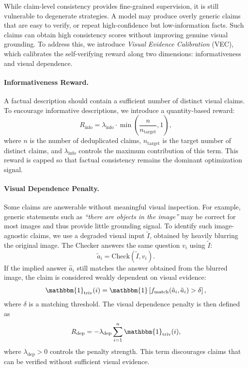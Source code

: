 While claim-level consistency provides fine-grained supervision, it is still
vulnerable to degenerate strategies. A model may produce overly generic claims
that are easy to verify, or repeat high-confidence but low-information facts.
Such claims can obtain high consistency scores without improving genuine visual
grounding. To address this, we introduce \textit{Visual Evidence Calibration}
(VEC), which calibrates the self-verifying reward along two dimensions:
informativeness and visual dependence.

\paragraph{Informativeness Reward.}
A factual description should contain a sufficient number of distinct visual
claims. To encourage informative descriptions, we introduce a quantity-based
reward:
\begin{equation}
    R_{\mathrm{info}}
    =
    \lambda_{\mathrm{info}}
    \cdot
    \min
    \left(
        \frac{n}{n_{\mathrm{target}}},
        1
    \right),
\end{equation}
where $n$ is the number of deduplicated claims,
$n_{\mathrm{target}}$ is the target number of distinct claims, and
$\lambda_{\mathrm{info}}$ controls the maximum contribution of this term. This
reward is capped so that factual consistency remains the dominant optimization
signal.

\paragraph{Visual Dependence Penalty.}
Some claims are answerable without meaningful visual inspection. For example,
generic statements such as \textit{``there are objects in the image''} may be
correct for most images and thus provide little grounding signal. To identify
such image-agnostic claims, we use a degraded visual input $\tilde{I}$, obtained
by heavily blurring the original image. The Checker answers the same question
$v_i$ using $\tilde{I}$:
\begin{equation}
    \tilde{a}_i =
    \mathrm{Check}(\tilde{I},v_i).
\end{equation}
If the implied answer $\hat{a}_i$ still matches the answer obtained from the
blurred image, the claim is considered weakly dependent on visual evidence:
\begin{equation}
    \mathbbm{1}_{\mathrm{triv}}(i)
    =
    \mathbbm{1}
    \left[
        f_{\mathrm{match}}(\hat{a}_i,\tilde{a}_i)>\delta
    \right],
\end{equation}
where $\delta$ is a matching threshold. The visual dependence penalty is then
defined as
\begin{equation}
    R_{\mathrm{dep}}
    =
    -
    \lambda_{\mathrm{dep}}
    \sum_{i=1}^{n}
    \mathbbm{1}_{\mathrm{triv}}(i),
\end{equation}
where $\lambda_{\mathrm{dep}}>0$ controls the penalty strength. This term
discourages claims that can be verified without sufficient visual evidence.

